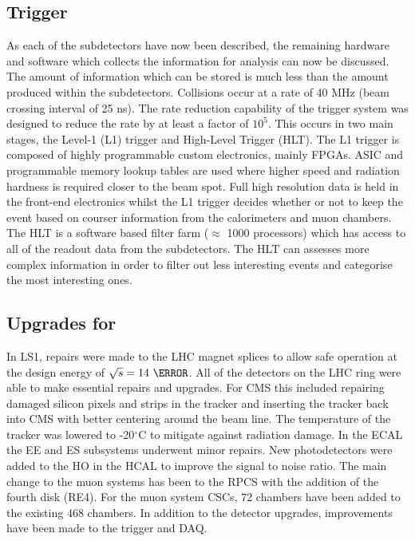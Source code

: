 \subsection{Trigger \label{det:trigger}}
As each of the subdetectors have now been described, the remaining hardware and software which collects the information for analysis can now be discussed. The amount of information which can be stored is much less than the amount produced within the subdetectors. Collisions occur at a rate of 40 MHz (beam crossing interval of 25 ns). The rate reduction capability of the trigger system was designed to reduce the rate by at least a factor of $10^5$. This occurs in two main stages, the Level-1 (L1) trigger and High-Level Trigger (HLT). The L1 trigger is composed of highly programmable custom electronics, mainly FPGAs. ASIC and programmable memory lookup tables are used where higher speed and radiation hardness is required closer to the beam spot. Full high resolution data is held in the front-end electronics whilst the L1 trigger decides whether or not to keep the event based on courser information from the calorimeters and muon chambers. The HLT is a software based filter farm ($\approx$ 1000 processors) which has access to all of the readout data from the subdetectors. The HLT can assesses more complex information in order to filter out less interesting events and categorise the most interesting ones. 

\subsection{Upgrades for \runtwo}

In LS1, repairs were made to the LHC magnet splices to allow safe operation at the design energy of $\sqrt{s} = 14~\TeV$. All of the detectors on the LHC ring were able to make essential repairs and upgrades. For CMS this included repairing damaged silicon pixels and strips in the tracker and inserting the tracker back into CMS with better centering around the beam line. The temperature of the tracker was lowered to -20$^{\circ}$C to mitigate against radiation damage. In the ECAL the EE and ES subsystems underwent minor repairs. New photodetectors were added to the HO in the HCAL to improve the signal to noise ratio. The main change to the muon systems has been to the RPCS with the addition of the fourth disk (RE4). For the muon system CSCs, 72 chambers have been added to the existing 468 chambers. In addition to the detector upgrades, improvements have been made to the trigger and DAQ.

